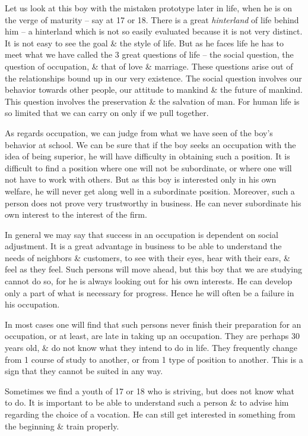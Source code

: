 \documentclass{article}
\begin{document}
Let us look at this boy with the mistaken prototype later in life, when he is on the verge of maturity -- say at 17 or 18. There is a great \textit{hinterland} of life behind him -- a hinterland which is not so easily evaluated because it is not very distinct. It is not easy to see the goal \& the style of life. But as he faces life he has to meet what we have called the 3 great questions of life -- the social question, the question of occupation, \& that of love \& marriage. These questions arise out of the relationships bound up in our very existence. The social question involves our behavior towards other people, our attitude to mankind \& the future of mankind. This question involves the preservation \& the salvation of man. For human life is so limited that we can carry on only if we pull together.

As regards occupation, we can judge from what we have seen of the boy's behavior at school. We can be sure that if the boy seeks an occupation with the idea of being superior, he will have difficulty in obtaining such a position. It is difficult to find a position where one will not be subordinate, or where one will not have to work with others. But as this boy is interested only in his own welfare, he will never get along well in a subordinate position. Moreover, such a person does not prove very trustworthy in business. He can never subordinate his own interest to the interest of the firm.

In general we may say that success in an occupation is dependent on social adjustment. It is a great advantage in business to be able to understand the needs of neighbors \& customers, to see with their eyes, hear with their ears, \& feel as they feel. Such persons will move ahead, but this boy that we are studying cannot do so, for he is always looking out for his own interests. He can develop only a part of what is necessary for progress. Hence he will often be a failure in his occupation.

In most cases one will find that such persons never finish their preparation for an occupation, or at least, are late in taking up an occupation. They are perhaps 30 years old, \& do not know what they intend to do in life. They frequently change from 1 course of study to another, or from 1 type of position to another. This is a sign that they cannot be suited in any way.

Sometimes we find a youth of 17 or 18 who is striving, but does not know what to do. It is important to be able to understand such a person \& to advise him regarding the choice of a vocation. He can still get interested in something from the beginning \& train properly.
\end{document}
